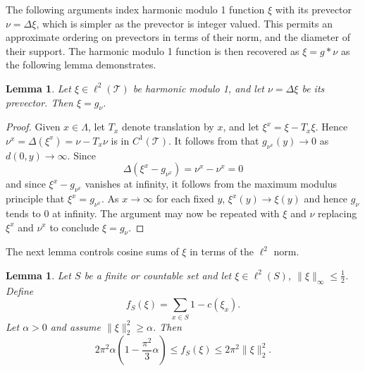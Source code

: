 \documentclass[a4paper, 12pt, notitlepage]{amsart}
\newcommand{\sT}{\mathscr{T}}
\newtheorem{lemma}[theorem]{Lemma}
\theoremstyle{remark}
\begin{document}
The following arguments index harmonic modulo 1 function $\xi$ with its prevector $\nu = \Delta \xi$, which is simpler as the prevector is integer valued.  This permits an approximate ordering on prevectors in terms of their norm, and the diameter of their support.  The harmonic modulo 1 function is then recovered as $\xi = g * \nu$ as the following lemma demonstrates.
\begin{lemma}
 Let $\xi \in \ell^2(\sT)$ be harmonic modulo 1, and let $\nu = \Delta \xi$ be its prevector.  Then $\xi = g_\nu$.
\end{lemma}
\begin{proof}
 Given $x \in \Lambda$, let $T_x$ denote translation by $x$, and let $\xi^x = \xi - T_x \xi$.  Hence $\nu^x = \Delta(\xi^x) = \nu - T_x \nu$ is in $C^1(\sT)$.  It follows from \cite{HS19} that $g_{\nu^x}(y) \to 0$ as $d(0,y) \to \infty$.  Since 
 \[
  \Delta(\xi^x - g_{\nu^x}) = \nu^x - \nu^x = 0
 \]
and since $\xi^x - g_{\nu^x}$ vanishes at infinity, it follows from the maximum modulus principle that $\xi^x = g_{\nu^x}$.  As $x \to \infty$ for each fixed $y$, $\xi^x(y) \to \xi(y)$ and hence $g_{\nu}$ tends to 0 at infinity.  The argument may now be repeated with $\xi$ and $\nu$ replacing $\xi^x$ and $\nu^x$ to conclude $\xi = g_{\nu}$.
\end{proof}

The next lemma controls cosine sums of $\xi$ in terms of the $\ell^2$ norm.

\begin{lemma}\label{2_norm_lemma}
 Let $S$ be a finite or countable set and let $\xi \in \ell^2(S)$, $\|\xi\|_\infty \leq \frac{1}{2}$.  Define 
 \begin{equation}
  f_S(\xi) = \sum_{x \in S} 1 - c(\xi_x).
 \end{equation}
Let $\alpha > 0$ and assume $\|\xi\|_2^2 \geq \alpha$.  Then
\begin{equation}
  2\pi^2 \alpha \left(1 - \frac{\pi^2}{3} \alpha\right) \leq f_S(\xi) \leq 2\pi^2 \|\xi\|_2^2.
\end{equation}
\end{lemma}
\end{document}
